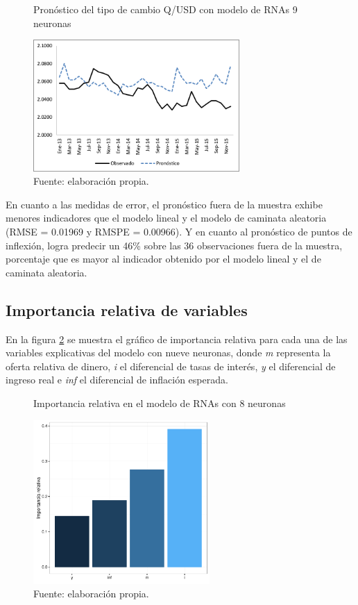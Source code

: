 \begin{figure}[htb]
	\centering
	\caption{Pronóstico del tipo de cambio Q/USD con modelo de RNAs 9 neuronas}
	\label{fig:annout19}
	\includegraphics[width=0.7\textwidth]{figuras/ann19_out.png}
	\caption*{Fuente: elaboración propia.}
\end{figure}

En cuanto a las medidas de error, el pronóstico fuera de la muestra exhibe menores indicadores que el modelo lineal y el modelo de caminata aleatoria (RMSE = 0.01969 y RMSPE = 0.00966). Y en cuanto al pronóstico de puntos de inflexión, logra predecir un 46\% sobre las 36 observaciones fuera de la muestra, porcentaje que es mayor al indicador obtenido por el modelo lineal y el de caminata aleatoria.


\subsection{Importancia relativa de variables}
En la figura \ref{fig:importrel18} se muestra el gráfico de importancia relativa para cada una de las variables explicativas del modelo con nueve neuronas, donde \textit{m} representa la oferta relativa de dinero, \textit{i} el diferencial de tasas de interés, \textit{y} el diferencial de ingreso real e \textit{inf} el diferencial de inflación esperada.

\begin{figure}[htb]
	\centering
	\caption{Importancia relativa en el modelo de RNAs con 8 neuronas}
	\label{fig:importrel18}
	\includegraphics[width=0.6\textwidth]{figuras/garson_18.pdf}
	\caption*{Fuente: elaboración propia.}
\end{figure}

